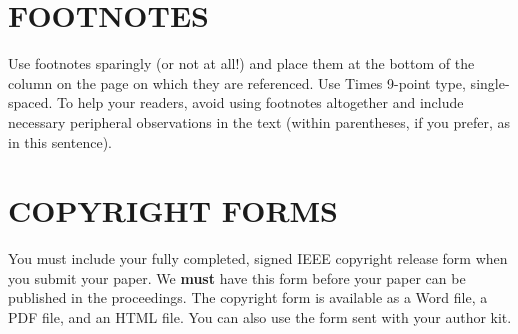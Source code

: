 \documentclass{article}
\begin{document}
\vfill
\pagebreak


\section{FOOTNOTES}
\label{sec:foot}

Use footnotes sparingly (or not at all!) and place them at the bottom of the
column on the page on which they are referenced. Use Times 9-point type,
single-spaced. To help your readers, avoid using footnotes altogether and
include necessary peripheral observations in the text (within parentheses, if
you prefer, as in this sentence).


\section{COPYRIGHT FORMS}
\label{sec:copyright}

You must include your fully completed, signed IEEE copyright release form when
you submit your paper. We {\bf must} have this form before your paper can be
published in the proceedings.  The copyright form is available as a Word file,
a PDF file, and an HTML file. You can also use the form sent with your author
kit.



\end{document}
